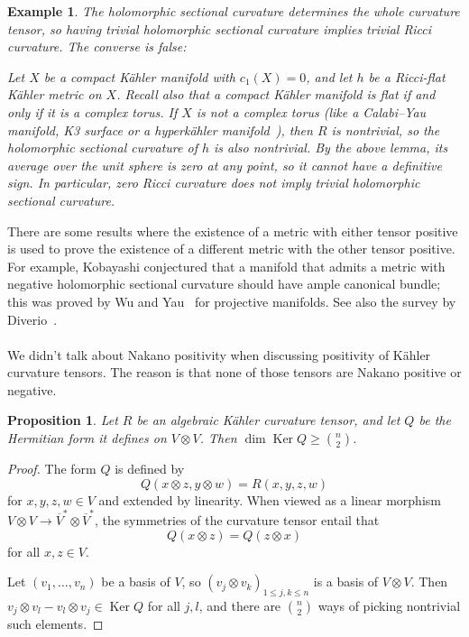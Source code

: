 \documentclass[11pt]{article}
\newtheorem{prop}[theo]{Proposition}
\newtheorem{exam}[theo]{Example}
\newtheorem*{proof}{Proof}
\DeclareMathOperator{\Ker}{Ker}
\begin{document}
\begin{exam}
The holomorphic sectional curvature determines the whole curvature tensor, so having trivial holomorphic sectional curvature implies trivial Ricci curvature. The converse is false:

Let $X$ be a compact K\"ahler manifold with $c_1(X) = 0$, and let $h$ be a Ricci-flat K\"ahler metric on $X$. Recall also that a compact K\"ahler manifold is flat if and only if it is a complex torus. If $X$ is not a complex torus (like a Calabi--Yau manifold, K3 surface or a hyperk\"ahler manifold~\cite{beauville1983}), then $R$ is nontrivial, so the holomorphic sectional curvature of $h$ is also nontrivial. By the above lemma, its average over the unit sphere is zero at any point, so it cannot have a definitive sign. In particular, zero Ricci curvature does not imply trivial holomorphic sectional curvature.
\end{exam}

There are some results where the existence of a metric with either tensor positive is used to prove the existence of a different metric with the other tensor positive. For example, Kobayashi conjectured that a manifold that admits a metric with negative holomorphic sectional curvature should have ample canonical bundle; this was proved by Wu and Yau~\cite{wu2016negative} for projective manifolds. See also the survey by Diverio~\cite{diverio2020kobayashi}.



\paragraph{}
We didn't talk about Nakano positivity when discussing positivity of K\"ahler curvature tensors. The reason is that none of those tensors are Nakano positive or negative.

\begin{prop}
Let $R$ be an algebraic K\"ahler curvature tensor, and let $Q$ be the Hermitian form it defines on $V \otimes V$. Then $\dim \Ker Q \geq \binom n2$.
\end{prop}

\begin{proof}
The form $Q$ is defined by
$$
Q(x \otimes z, y \otimes w) = R(x,y,z,w)
$$
for $x,y,z,w \in V$ and extended by linearity. When viewed as a linear morphism $V \otimes V \to \overline V^* \otimes \overline V^*$, the symmetries of the curvature tensor entail that
$$
Q(x \otimes z) = Q(z \otimes x)
$$
for all $x, z \in V$.

Let $(v_1,\ldots,v_n)$ be a basis of $V$, so $(v_j \otimes v_k)_{1 \leq j,k \leq n}$ is a basis of $V \otimes V$. Then $v_j \otimes v_l - v_l \otimes v_j \in \Ker Q$ for all $j, l$, and there are $\binom n2$ ways of picking nontrivial such elements.
\end{proof}
\end{document}
